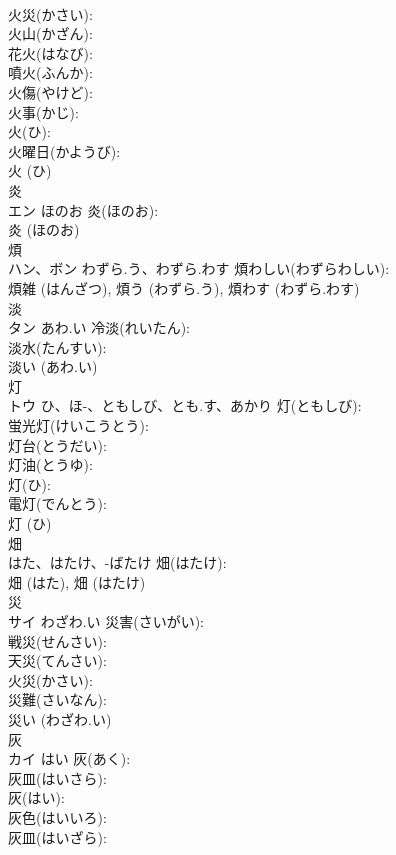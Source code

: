 \documentclass[8pt]{extreport}
\begin{document}
\begin{CJK}{UTF8}{min}
\\	火災(かさい): 
\\	火山(かざん): 
\\	花火(はなび): 
\\	噴火(ふんか): 
\\	火傷(やけど): 
\\	火事(かじ): 
\\	火(ひ): 
\\	火曜日(かようび): 
\\	火 (ひ)
\\	炎			
\\	エン	ほのお	炎(ほのお): 
\\	炎 (ほのお)
\\	煩			
\\	ハン、ボン	わずら.う、わずら.わす	煩わしい(わずらわしい): 
\\	煩雑 (はんざつ), 煩う (わずら.う), 煩わす (わずら.わす)
\\	淡			
\\	タン	あわ.い	冷淡(れいたん): 
\\	淡水(たんすい): 
\\	淡い (あわ.い)
\\	灯			
\\	トウ	ひ、ほ-、ともしび、とも.す、あかり	灯(ともしび): 
\\	蛍光灯(けいこうとう): 
\\	灯台(とうだい): 
\\	灯油(とうゆ): 
\\	灯(ひ): 
\\	電灯(でんとう): 
\\	灯 (ひ)
\\	畑			
\\	はた、はたけ、-ばたけ	畑(はたけ): 
\\	畑 (はた), 畑 (はたけ)
\\	災			
\\	サイ	わざわ.い	災害(さいがい): 
\\	戦災(せんさい): 
\\	天災(てんさい): 
\\	火災(かさい): 
\\	災難(さいなん): 
\\	災い (わざわ.い)
\\	灰			
\\	カイ	はい	灰(あく): 
\\	灰皿(はいさら): 
\\	灰(はい): 
\\	灰色(はいいろ): 
\\	灰皿(はいざら): 

\end{CJK}
\end{document}
